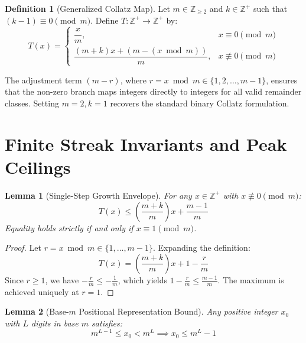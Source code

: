 \documentclass[11pt,a4paper]{article}
\theoremstyle{plain}
\newtheorem{lemma}{Lemma}
\theoremstyle{definition}
\newtheorem{definition}{Definition}
\begin{document}
\begin{definition}[Generalized Collatz Map]
Let $m \in \mathbb{Z}_{\ge 2}$ and $k \in \mathbb{Z}^+$ such that $(k-1) \equiv 0 \pmod m$. Define $T: \mathbb{Z}^+ \to \mathbb{Z}^+$ by:
\begin{equation}
T(x) = \begin{cases} 
\dfrac{x}{m}, & x \equiv 0 \pmod m \\[8pt]
\dfrac{(m + k)x + (m - (x \bmod m))}{m}, & x \not\equiv 0 \pmod m
\end{cases}
\end{equation}
\end{definition}

The adjustment term $(m - r)$, where $r = x \bmod m \in \{1, 2, \dots, m-1\}$, ensures that the non-zero branch maps integers directly to integers for all valid remainder classes. Setting $m=2, k=1$ recovers the standard binary Collatz formulation.

\section{Finite Streak Invariants and Peak Ceilings}

\begin{lemma}[Single-Step Growth Envelope]
For any $x \in \mathbb{Z}^+$ with $x \not\equiv 0 \pmod m$:
\begin{equation}
T(x) \le \left(\frac{m+k}{m}\right)x + \frac{m-1}{m}
\end{equation}
Equality holds strictly if and only if $x \equiv 1 \pmod m$.
\end{lemma}

\begin{proof}
Let $r = x \bmod m \in \{1, \dots, m-1\}$. Expanding the definition:
\begin{equation}
T(x) = \left(\frac{m+k}{m}\right)x + 1 - \frac{r}{m}
\end{equation}
Since $r \ge 1$, we have $-\frac{r}{m} \le -\frac{1}{m}$, which yields $1 - \frac{r}{m} \le \frac{m-1}{m}$. The maximum is achieved uniquely at $r = 1$.
\end{proof}

\begin{lemma}[Base-$m$ Positional Representation Bound]
Any positive integer $x_0$ with $L$ digits in base $m$ satisfies:
\begin{equation}
m^{L-1} \le x_0 < m^L \implies x_0 \le m^L - 1
\end{equation}
\end{lemma}
\end{document}
